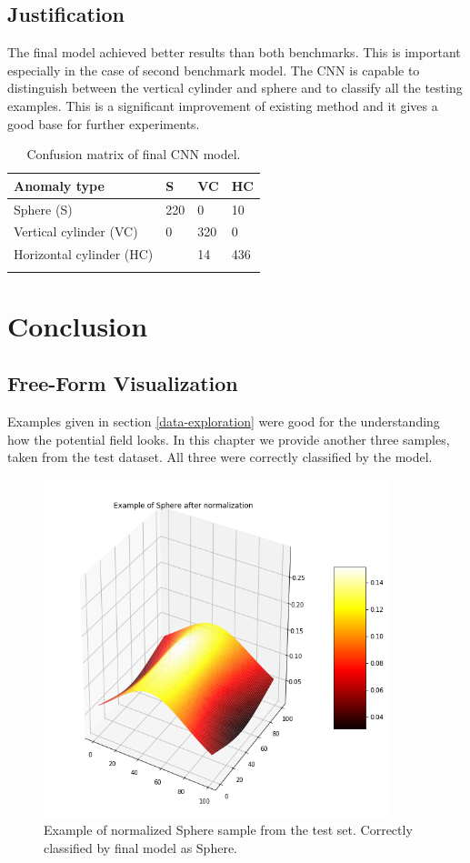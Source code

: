 \documentclass{article}
\begin{document}
\subsection{Justification}\label{justification}

The final model achieved better results than both benchmarks. This is
important especially in the case of second benchmark model. The CNN is
capable to distinguish between the vertical cylinder and sphere and to
classify all the testing examples. This is a significant improvement of
existing method and it gives a good base for further experiments.

\begin{longtable}[c]{@{}llll@{}}
\toprule
Anomaly type & S & VC & HC\tabularnewline
\midrule
\endhead
Sphere (S) & 220 & 0 & 10\tabularnewline
Vertical cylinder (VC) & 0 & 320 & 0\tabularnewline
Horizontal cylinder (HC) & & 14 & 436\tabularnewline
\bottomrule
\caption[Confusion matrix of final CNN model]{Confusion matrix of final CNN model.}
\label{tab:ConfusionMatrixFinalModel}
\end{longtable}

\section{Conclusion}\label{conclusion}

\subsection{Free-Form Visualization}\label{Free-Form Visualization}

Examples given in section \ref{data-exploration} were good for the understanding how the potential field
looks. In this chapter we provide another three samples, taken from the test dataset. All three
were correctly classified by the model.

\begin{figure}[!htp]
\centerline{\includegraphics[width=10cm]{img/sphere_normalized.png}}
\renewcommand{\figurename}{Figure}
\caption[Example of Sphere]{Example of normalized Sphere sample from the test set. Correctly classified by final model as Sphere.}
\label{fig:NormalizedSphere}
\end{figure}
\end{document}
